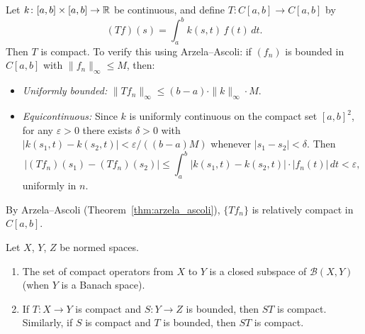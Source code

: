 \documentclass[11pt,a4paper]{article}
\begin{document}
\begin{example}
\label{ex:compact_integral}
Let $k \colon [a,b] \times [a,b] \to \mathbb{R}$ be continuous, and define
$T \colon C[a,b] \to C[a,b]$ by
\[
(Tf)(s) = \int_a^b k(s,t)\, f(t)\, dt.
\]
Then $T$ is compact. To verify this using Arzela--Ascoli: if $(f_n)$ is
bounded in $C[a,b]$ with $\|f_n\|_\infty \le M$, then:
\begin{itemize}[nosep]
    \item \emph{Uniformly bounded:}
          $\|Tf_n\|_\infty \le (b-a) \cdot \|k\|_\infty \cdot M$.
    \item \emph{Equicontinuous:} Since $k$ is uniformly continuous on the
          compact set $[a,b]^2$, for any $\varepsilon > 0$ there exists
          $\delta > 0$ with $|k(s_1, t) - k(s_2, t)| < \varepsilon /
          ((b-a)M)$ whenever $|s_1 - s_2| < \delta$. Then
          \[
          |(Tf_n)(s_1) - (Tf_n)(s_2)|
          \le \int_a^b |k(s_1,t) - k(s_2,t)| \cdot |f_n(t)|\, dt
          < \varepsilon,
          \]
          uniformly in $n$.
\end{itemize}
By Arzela--Ascoli (Theorem~\ref{thm:arzela_ascoli}), $\{Tf_n\}$ is
relatively compact in $C[a,b]$.
\end{example}

\begin{proposition}
\label{prop:compact_algebra}
Let $X$, $Y$, $Z$ be normed spaces.
\begin{enumerate}[label=(\roman*),nosep]
    \item The set of compact operators from $X$ to $Y$ is a closed subspace
          of $\mathcal{B}(X, Y)$ (when $Y$ is a Banach space).
    \item If $T \colon X \to Y$ is compact and $S \colon Y \to Z$ is bounded,
          then $ST$ is compact. Similarly, if $S$ is compact and $T$ is
          bounded, then $ST$ is compact.
\end{enumerate}
\end{proposition}
\end{document}

